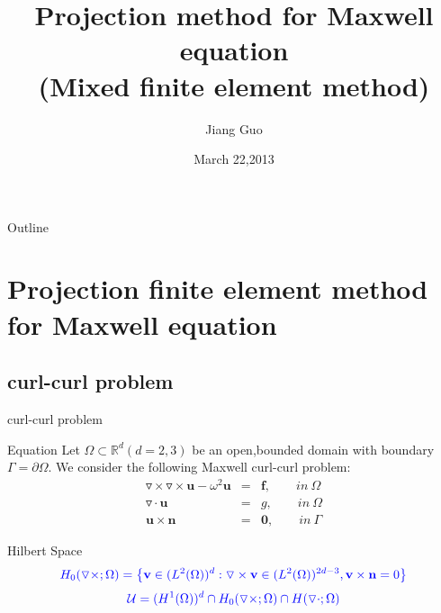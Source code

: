 \documentclass[13pt]{beamer}
\begin{document}

\title{Projection method for Maxwell equation\\(Mixed finite element method)}
\author{\color{blue}Jiang Guo}
\date{March 22,2013}

\begin{frame}
  \titlepage
\end{frame}

\begin{frame}{Outline}
  \tableofcontents
\end{frame}

\section{Projection finite element method for Maxwell equation}

\subsection{curl-curl problem}

\begin{frame}[t]{curl-curl problem}
  \begin{block}{Equation}
   Let $\Omega\subset\mathbb{R}^d (d=2,3)$ be an open,bounded domain with boundary $\Gamma=\partial\Omega.$
We consider the following Maxwell curl-curl problem:
  \begin{eqnarray}
     \triangledown\times\triangledown\times \textbf{u} - \omega^2\mathbf{u} & = & \mathbf{f}, \qquad  in\ \Omega \\
     \triangledown\cdot\mathbf{u}  & = & g, \qquad in \ \Omega \\
     \mathbf{u}\times\mathbf{n} & = & \mathbf{0}, \qquad in\ \Gamma
  \end{eqnarray}
  \end{block}
  \begin{block}{Hilbert Space}
    \begin{equation}\label{space:U_h}
        \nonumber
        {\color{blue}H_0(\triangledown\times;\Omega) = \big\{\mathbf{v}\in (L^2(\Omega))^d : \triangledown\times\mathbf{v}\in (L^2(\Omega))^{2d-3}, \mathbf{v}\times\mathbf{n} = 0\big\}}
        \end{equation}
        \begin{equation}\label{space:U+_h}
        \nonumber
        {\color{blue}\mathcal{U} = (H^1(\Omega))^d\cap H_0(\triangledown\times;\Omega)\cap H(\triangledown\cdot;\Omega)}
    \end{equation}
  \end{block}
\end{frame}
\end{document}
